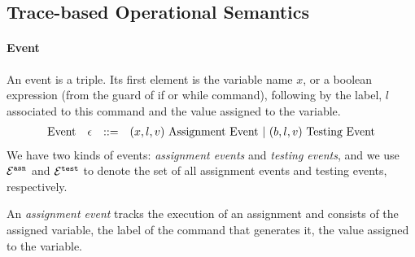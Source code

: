 

\subsection{{Trace-based Operational Semantics}}
\label{sec:operational_semantics}
\paragraph{Event}
An event is a triple.
Its first element is the variable name $x$,
or a boolean expression (from the guard of if or while command), 
following by 
 the label, $l$ associated to this command and the value assigned to the variable.
 \[
  \begin{array}{llll}
    \mbox{Event} 
    & \mathtt{\epsilon} & ::= & 
    ({x}, l, v) ~ \mbox{Assignment Event} 
    ~|~(b, l, v) ~ \mbox{Testing Event}
  \end{array}
  \]  
 We have two kinds of events: \emph{assignment events} and \emph{testing events},
 and we use $\mathcal{E}^{\mathtt{{asn}}}$ and $\mathcal{E}^{\mathtt{{test}}}$ to denote the set of all assignment events and testing events, respectively.
 
 An \emph{assignment event} tracks the execution of an assignment and consists of the assigned variable, the label of the command that generates it, the value assigned to the variable.

